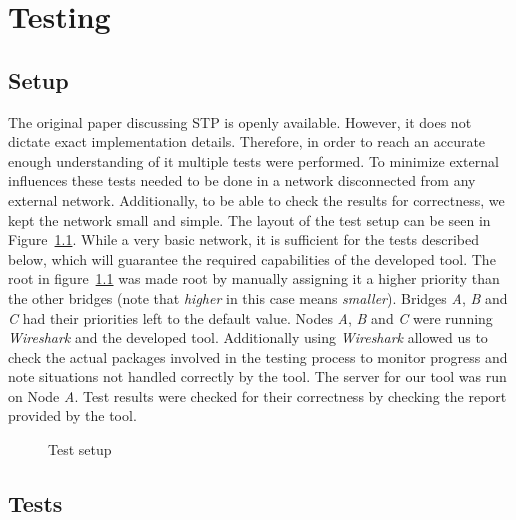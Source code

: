 \chapter{Testing}
\section{Setup}
The original paper discussing STP is openly available.
However, it does not dictate exact implementation details.
Therefore, in order to reach an accurate enough understanding of it multiple tests were performed.
To minimize external influences these tests needed to be done in a network disconnected from any external network.
Additionally, to be able to check the results for correctness, we kept the network small and simple.
The layout of the test setup can be seen in Figure~\ref{fig:test_setup}.
While a very basic network, it is sufficient for the tests described below, which will guarantee the required capabilities of the developed tool.
The root in figure~\ref{fig:test_setup} was made root by manually assigning it a higher priority than the other bridges (note that \textit{higher} in this case means \textit{smaller}).
Bridges \textit{A}, \textit{B} and \textit{C} had their priorities left to the default value.
Nodes \textit{A}, \textit{B} and \textit{C} were running \textit{Wireshark} and the developed tool.
Additionally using \textit{Wireshark} allowed us to check the actual packages involved in the testing process to monitor progress and note situations not handled correctly by the tool.
The server for our tool was run on Node \textit{A}.
Test results were checked for their correctness by checking the report provided by the tool.

\begin{figure}[h]
    \centering
    \caption{Test setup}
    \label{fig:test_setup}
\end{figure}

\section{Tests}
